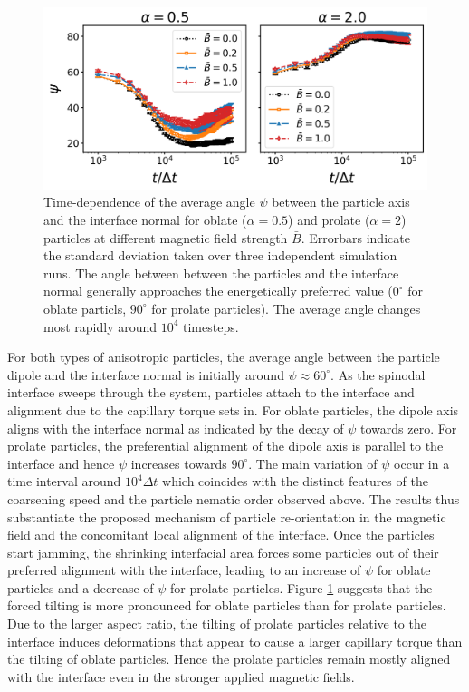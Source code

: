 \begin{figure}
\centering
\includegraphics[width=\columnwidth]{figures/results/paper1/psi-vs-t.png}
\caption{Time-dependence of the average angle $\psi$ between the particle axis and the interface normal for oblate ($\alpha=0.5$) and prolate ($\alpha=2$) particles at different magnetic field strength $\bar{B}$. Errorbars indicate the standard deviation taken over three independent simulation runs. The angle between between the particles and the interface normal generally approaches the energetically preferred value ($0^\circ$ for oblate particls, $90^\circ$ for prolate particles). The average angle changes most rapidly around $10^4$ timesteps.}
\label{fig:psi_time}
\end{figure}

For both types of anisotropic particles, the average angle between the
particle dipole and the interface normal is initially around
\(\psi\approx60^\circ\). As the spinodal interface sweeps through the
system, particles attach to the interface and alignment due to the
capillary torque sets in. For oblate particles, the dipole axis aligns
with the interface normal as indicated by the decay of \(\psi\) towards
zero. For prolate particles, the preferential alignment of the dipole
axis is parallel to the interface and hence \(\psi\) increases towards
\(90^\circ\). The main variation of \(\psi\) occur in a time interval
around \(10^4\Delta t\) which coincides with the distinct features of
the coarsening speed and the particle nematic order observed above. The
results thus substantiate the proposed mechanism of particle
re-orientation in the magnetic field and the concomitant local alignment
of the interface. Once the particles start jamming, the shrinking
interfacial area forces some particles out of their preferred alignment
with the interface, leading to an increase of \(\psi\) for oblate
particles and a decrease of \(\psi\) for prolate particles. Figure
\ref{fig:psi_time} suggests that the forced tilting is more pronounced
for oblate particles than for prolate particles. Due to the larger
aspect ratio, the tilting of prolate particles relative to the interface
induces deformations that appear to cause a larger capillary torque than
the tilting of oblate particles. %
Hence the prolate particles remain mostly aligned with the interface
even in the stronger applied magnetic fields.

